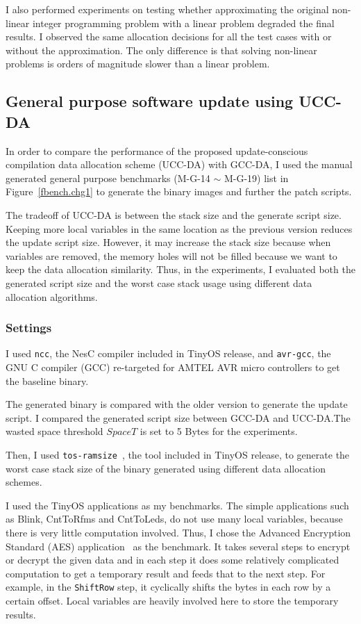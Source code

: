 I also performed experiments on testing whether approximating the
original non-linear integer programming problem with a linear problem
degraded the final results. I observed the same allocation decisions
for all the test cases with or without the approximation. The only
difference is that solving non-linear problems is orders of
magnitude slower than a linear problem.




\subsection{General purpose software update using UCC-DA}\label{exper-da}

In order to compare the performance of the proposed update-conscious compilation data
allocation scheme (UCC-DA) with GCC-DA, I used the manual generated general purpose 
benchmarks (M-G-14 $\sim$ M-G-19) list in
Figure~\ref{fbench.chg1} to generate the binary images and further the patch scripts.

The tradeoff of UCC-DA is between the stack size and the generate script size.
Keeping more local variables in the same location as the previous version reduces
the update script size. However, it may increase the stack size because when variables
are removed, the memory holes will not be filled because we want to 
keep the data allocation similarity. Thus, in the experiments, I evaluated both the
generated script size and the worst case stack usage using different data allocation
algorithms.

\subsubsection{Settings}

I used {\tt ncc}, the NesC compiler
included in TinyOS release, and {\tt avr-gcc}, the GNU C compiler
(GCC) re-targeted for AMTEL AVR micro controllers to get the baseline binary.

The generated binary is compared with the older version to generate
the update script. I compared the generated script size between GCC-DA
and UCC-DA.The wasted space threshold $SpaceT$ is set to 5 Bytes for the experiments.


Then, I used {\tt tos-ramsize}~\cite{ramsize}, the tool included in TinyOS release, to
generate the worst case stack size of the binary generated using
different data allocation schemes.

I used the TinyOS applications as my benchmarks. The simple applications
such as Blink, CntToRfms and CntToLeds, do not use many local variables,
because there is very little computation involved.
Thus, I chose the Advanced Encryption Standard (AES) application~\cite{aes} as the benchmark. 
It takes several steps to encrypt or decrypt the given data and in each step it does
some relatively complicated computation to get a temporary result and feeds that
to the next step. For example, in the  {\tt ShiftRow} step, it  
cyclically shifts the bytes in each row by a certain offset. 
Local variables are heavily involved here to store the temporary results.

